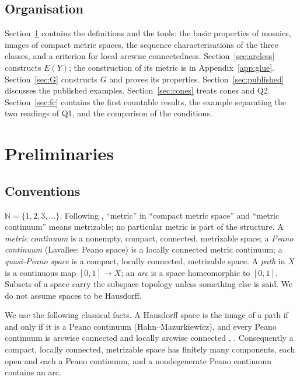 \documentclass[11pt]{amsart}
\theoremstyle{definition}
\theoremstyle{remark}
\newcommand{\N}{\mathbb{N}}
\numberwithin{equation}{section}
\begin{document}
\subsection{Organisation}
Section~\ref{sec:prelim} contains the definitions and the tools: the basic properties of mosaics, images of compact metric spaces, the sequence characterisations of the three classes, and a criterion for local arcwise connectedness. Section~\ref{sec:arcless} constructs $E(Y)$; the construction of its metric is in Appendix~\ref{app:glue}. Section~\ref{sec:G} constructs $G$ and proves its properties. Section~\ref{sec:published} discusses the published examples. Section~\ref{sec:cones} treats cones and Q2. Section~\ref{sec:fc} contains the first countable results, the example separating the two readings of Q1, and the comparison of the conditions.

\section{Preliminaries}\label{sec:prelim}

\subsection{Conventions}
$\N=\{1,2,3,\dots\}$. Following \cite{lavallee64}, ``metric'' in ``compact metric space'' and ``metric continuum'' means metrizable; no particular metric is part of the structure. A \emph{metric continuum} is a nonempty, compact, connected, metrizable space; a \emph{Peano continuum} (Lavallee: Peano space) is a locally connected metric continuum; a \emph{quasi-Peano space} is a compact, locally connected, metrizable space. A \emph{path} in $X$ is a continuous map $[0,1]\to X$; an \emph{arc} is a space homeomorphic to $[0,1]$. Subsets of a space carry the subspace topology unless something else is said. We do not assume spaces to be Hausdorff.

We use the following classical facts. A Hausdorff space is the image of a path if and only if it is a Peano continuum (Hahn--Mazurkiewicz), and every Peano continuum is arcwise connected and locally arcwise connected \cite[Section~31]{willard}, \cite[Section~6.3]{engelking}. Consequently a compact, locally connected, metrizable space has finitely many components, each open and each a Peano continuum, and a nondegenerate Peano continuum contains an arc.
\end{document}
